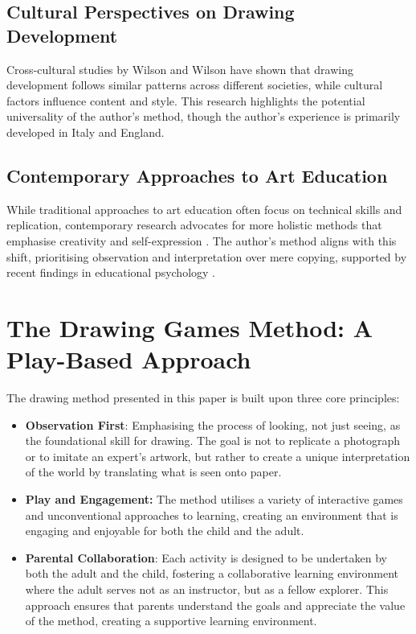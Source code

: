 \documentclass{article}
\begin{document}
\subsection{Cultural Perspectives on Drawing Development}

Cross-cultural studies by Wilson and Wilson \cite{13wilson1982teaching} have shown that drawing development follows similar patterns across different societies, while cultural factors influence content and style. This research highlights the potential universality of the author's method, though the author's experience is primarily developed in Italy and England.

\subsection{Contemporary Approaches to Art Education}

While traditional approaches to art education often focus on technical skills and replication, contemporary research advocates for more holistic methods that emphasise creativity and self-expression \cite{14sheridan2022studio}. The author's method aligns with this shift, prioritising observation and interpretation over mere copying, supported by recent findings in educational psychology \cite{15gardner1990art}.



\section{The Drawing Games Method: A Play-Based Approach}
\label{sec:others}

The drawing method presented in this paper is built upon three core principles:

\begin{itemize}
    \item \textbf{Observation First}: Emphasising the process of looking, not just seeing, as the foundational skill for drawing. The goal is not to replicate a photograph or to imitate an expert’s artwork, but rather to create a unique interpretation of the world by translating what is seen onto paper.
    \item \textbf{Play and Engagement:} The method utilises a variety of interactive games and unconventional approaches to learning, creating an environment that is engaging and enjoyable for both the child and the adult.
    \item \textbf{Parental Collaboration}: Each activity is designed to be undertaken by both the adult and the child, fostering a collaborative learning environment where the adult serves not as an instructor, but as a fellow explorer. This approach ensures that parents understand the goals and appreciate the value of the method, creating a supportive learning environment.
\end{itemize}
\end{document}
